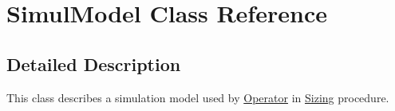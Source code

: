 \hypertarget{class_simul_model}{}\section{Simul\+Model Class Reference}
\label{class_simul_model}


\subsection{Detailed Description}
This class describes a simulation model used by \mbox{\hyperlink{class_operator}{Operator}} in \mbox{\hyperlink{class_sizing}{Sizing}} procedure. 